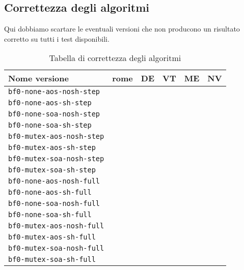 \documentclass[a4paper]{article}
\begin{document}
	\subsection{Correttezza degli algoritmi}
	Qui dobbiamo scartare le eventuali versioni che non producono un risultato corretto su tutti i test disponibili.
	\begin{table}[!ht]
		\centering
		\begin{tabular}{|l|c|c|c|c|c|}
			\hline
			\textbf{Nome versione} & \textbf{rome} & \textbf{DE} & \textbf{VT} & \textbf{ME} & \textbf{NV} \\ \hline
			\texttt{bf0-none-aos-nosh-step}  &  &  &  &  &  \\ \hline
			\texttt{bf0-none-aos-sh-step}    &  &  &  &  &  \\ \hline
			\texttt{bf0-none-soa-nosh-step}  &  &  &  &  &  \\ \hline
			\texttt{bf0-none-soa-sh-step}    &  &  &  &  &  \\ \hline
			\texttt{bf0-mutex-aos-nosh-step} &  &  &  &  &  \\ \hline
			\texttt{bf0-mutex-aos-sh-step}   &  &  &  &  &  \\ \hline
			\texttt{bf0-mutex-soa-nosh-step} &  &  &  &  &  \\ \hline
			\texttt{bf0-mutex-soa-sh-step}   &  &  &  &  &  \\ \hline
			\texttt{bf0-none-aos-nosh-full}  &  &  &  &  &  \\ \hline
			\texttt{bf0-none-aos-sh-full}    &  &  &  &  &  \\ \hline
			\texttt{bf0-none-soa-nosh-full}  &  &  &  &  &  \\ \hline
			\texttt{bf0-none-soa-sh-full}    &  &  &  &  &  \\ \hline
			\texttt{bf0-mutex-aos-nosh-full} &  &  &  &  &  \\ \hline
			\texttt{bf0-mutex-aos-sh-full}   &  &  &  &  &  \\ \hline
			\texttt{bf0-mutex-soa-nosh-full} &  &  &  &  &  \\ \hline
			\texttt{bf0-mutex-soa-sh-full}   &  &  &  &  &  \\ \hline
		\end{tabular}
		\label{tab:correttezza}
		\caption{Tabella di correttezza degli algoritmi}
	\end{table}
	
\end{document}
